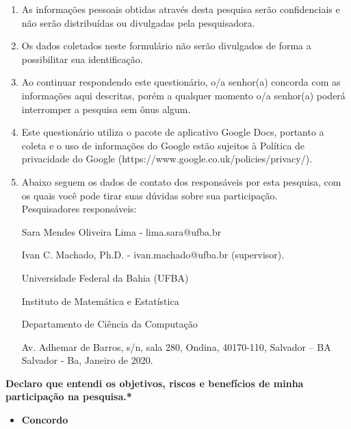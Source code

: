 \begin{enumerate}[label=\bf A\arabic*,leftmargin=1.8cm]
\begin{enumerate}[label= \arabic*]
        \item As informações pessoais obtidas através desta pesquisa serão confidenciais e não serão distribuídas ou divulgadas pela pesquisadora.

        \item Os dados coletados neste formulário não serão divulgados de forma a possibilitar sua identificação.

        \item Ao continuar respondendo este questionário, o/a senhor(a) concorda com as informações aqui descritas, porém a qualquer momento o/a senhor(a) poderá interromper a pesquisa sem ônus algum.

        \item Este questionário utiliza o pacote de aplicativo Google Docs, portanto a coleta e o uso de informações do Google estão sujeitos à Política de privacidade do Google (https://www.google.co.uk/policies/privacy/).

        \item Abaixo seguem os dados de contato dos responsáveis por esta pesquisa, com os quais você pode tirar suas dúvidas sobre sua participação.\\
        
        Pesquisadores responsáveis:
        
        
        Sara Mendes Oliveira Lima - lima.sara@ufba.br
        
        Ivan C. Machado, Ph.D. - ivan.machado@ufba.br (supervisor). 
        
        Universidade Federal da Bahia (UFBA)
        
        Instituto de Matemática e Estatística
        
        Departamento de Ciência da Computação
        
        Av. Adhemar de Barros, s/n, sala 280, Ondina, 40170-110, Salvador – BA\\
   
        
        Salvador - Ba, Janeiro de 2020.

    \end{enumerate}
    
    
    
    \textbf{Declaro que entendi os objetivos, riscos e benefícios de minha participação na pesquisa.*}

    \begin{itemize}
        \item \textbf{Concordo}
    \end{itemize}
    

\end{enumerate}
